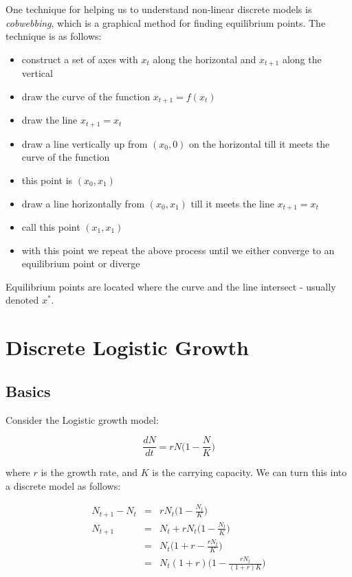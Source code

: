 \documentclass{report}
\begin{document}
One technique for helping us to understand non-linear discrete models is
\emph{cobwebbing}, which is a graphical method for finding equilibrium points. The
technique is as follows: \bigskip

\begin{itemize}
	\item construct a set of axes with $x_t$ along the horizontal and $x_{t + 1}$ along the vertical
	\item draw the curve of the function $x_{t + 1} = f(x_t)$
	\item draw the line $x_{t + 1} = x_t$
	\item draw a line vertically up from $(x_0, 0)$ on the horizontal till it meets the curve of the function
	\item this point is $(x_0, x_1)$
	\item draw a line horizontally from $(x_0, x_1)$ till it meets the line $x_{t + 1} = x_t$
	\item call this point $(x_1, x_1)$
	\item with this point we repeat the above process until we either converge to an equilibrium point or diverge
\end{itemize}\medskip

Equilibrium points are located where the curve and the line intersect - usually denoted $x^*$. \bigskip









\chapter{Discrete Logistic Growth}




\section{Basics}

Consider the Logistic growth model: \bigskip

\[
	\frac{dN}{dt} = r N \Bigg( 1 - \frac{N}{K} \Bigg)
\]\medskip

where $r$ is the growth rate, and $K$ is the carrying capacity. We can turn this into a
discrete model as follows: \bigskip

\begin{eqnarray*}
    N_{t + 1} - N_t & = & r N_t \Bigg( 1 - \frac{N_t}{K} \Bigg) \\
          N_{t + 1} & = & N_t + r N_t \Bigg( 1 - \frac{N_t}{K} \Bigg) \\
                    & = & N_t \Bigg( 1 + r - \frac{r N_t}{K} \Bigg) \\
                    & = & N_t (1 + r) \Bigg( 1 - \frac{r N_t}{(1 + r) K} \Bigg)
\end{eqnarray*}\medskip
\end{document}
